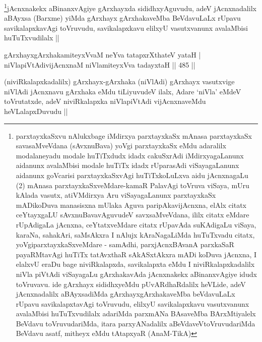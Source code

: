 \begin{artha}
\footnote{parxtayxkaSxvu nAlukxbage iMdirxya parxtayxkaSx mAnasa parxtayxkaSx savasaMveVdana (sAvxnuBava) yoVgi parxtayxkaSx eMdu adaralilx modalaneyadu modale huTiTxdudx idadx cakuSxrAdi iMdirxyagaLanunx aidanunx avalaMbisi modale huTiTx idadx rUparasAdi viSayagaLanunx aidanunx goVcarisi parxtayxkaSxvAgi huTiTxkoLuLxva aidu jAcnxnagaLu (2) mAnasa parxtayxkaSxveMdare-kamaR PalavAgi toVruva viSaya, mUru kAlada vasutx, atiVMdirxya Aru viSayagaLanunx parxtayxkaSx mADikoDuva manasisxna mUlaka Aguva paripAkavijAcnxna, elAlx citatx ceYtayxgaLU sAvxnuBavavAguvudeV savxsaMveVdana, ililx citatx eMdare rUpAdigaLa jAcnxna, ceYtatxveMdare citatx rUpavAda suKAdigaLu viSaya, karaNa, sahakAri, saMsAkxra I nAlujx kAraNagaLiMda huTuTxvadu citatx, yoVgiparxtayxkaSxveMdare - samAdhi, parxjAcnxBAvanA parxkaSaR payaRMtavAgi huTiTx tatAvxthaR sAkASxtAkxra mADi koDuva jAcnxna, I elalxvU eraDu bage niviRkalapxda, savikalapxta eMdu I niviRkalapxkadalilx  niVla piVtAdi viSayagaLu gArxhakavAda jAcnxnakekx aBinanxvAgiye idudx toVruvavu. ide gArxhayx sididhxyeMdu pUvARdhaRdalilx heVLide, adeV jAcnxnadalilx aBAyxsadiMda gArxhayxgArxhakaveMba beVdavuLaLx rUpavu savikalapxtavAgi toVruvudu, elilxyU savikalapxkavu vasutxvanunx avalaMbisi huTuTxvudilalx adariMda parxmANa BAsaveMba BArxMtiyalelx BeVdavu toVruvudariMda, itara parxyANadalilx aBeVdaveVtoVruvudariMda BeVdavu asatf, mitheyx eMdu tAtapxyaR (AnaM-TikA)}jAcnxnakekx aBinanxvAgiye gArxhayxda sididhxyAguvudu, adeV jAcnxnadalilx aBAyxsa (Barxme) yiMda gArxhayx gArxhakaveMba BeVdavuLaLx rUpavu savikalapxkavAgi toVruvudu, savikalapxkavu elilxyU vasutxvanunx avalaMbisi huTuTxvudilalx ||
\end{artha}


\begin{shl}
gArxhayxgArxhakamiteyxVvaM neYva tatapxrXthateV yataH | \\
niVlapiVtAdivijAcnxnaM niVlamiteyxVva tadayxtaH \hfill||  485 ||  
\end{shl}

\begin{artha}
(niviRkalapxkadalilx) gArxhayx-gArxhaka (niVlAdi) gArxhayx vasutxvige niVlAdi jAcnxnavu gArxhaka eMdu tiLiyuvudeV ilalx, Adare `niVla' eMdeV toVrutatxde, adeV niviRkalapxka niVlapiVtAdi vijAcnxnaveMdu heVLalapxDuvudu ||
\end{artha}

